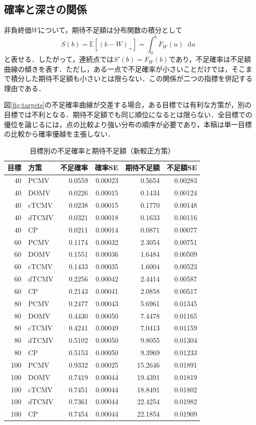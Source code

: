 \documentclass[11pt,a4paper]{article}
\numberwithin{equation}{section}
\numberwithin{table}{section}
\numberwithin{figure}{section}
\theoremstyle{plain}
\theoremstyle{definition}
\newcommand{\E}{\mathbb{E}}
\newcommand{\dd}{\mathop{}\!\mathrm{d}}
\begin{document}
\subsection{確率と深さの関係}
非負終価$W$について，期待不足額は分布関数の積分として
\begin{equation}
S(b)=\E[(b-W)_+]=\int_0^b F_W(u)\dd u
\end{equation}
と表せる．したがって，連続点では$S'(b)=F_W(b)$であり，不足確率は不足額曲線の傾きを表す．ただし，ある一点で不足確率が小さいことだけでは，そこまで積分した期待不足額も小さいとは限らない．この関係が二つの指標を併記する理由である．

図\ref{fig:targets}の不足確率曲線が交差する場合，ある目標では有利な方策が，別の目標では不利となる．期待不足額でも同じ順位になるとは限らない．全目標での優位を論じるには，点の比較より強い分布の順序が必要であり，本稿は単一目標の比較から確率優越を主張しない．

\begin{table}[htbp]\centering\small
\caption{目標別の不足確率と期待不足額（新較正方策）}\label{tab:targets}
\begin{tabular}{rlrrrr}\toprule
目標 & 方策 & 不足確率 & 確率SE & 期待不足額 & 不足額SE\\\midrule
40 & PCMV & 0.0559 & 0.00023 & 0.5654 & 0.00283 \\
40 & DOMV & 0.0226 & 0.00015 & 0.1434 & 0.00124 \\
40 & cTCMV & 0.0238 & 0.00015 & 0.1770 & 0.00148 \\
40 & dTCMV & 0.0321 & 0.00018 & 0.1633 & 0.00116 \\
40 & CP & 0.0211 & 0.00014 & 0.0871 & 0.00077 \\
\midrule
60 & PCMV & 0.1174 & 0.00032 & 2.3054 & 0.00751 \\
60 & DOMV & 0.1551 & 0.00036 & 1.6484 & 0.00509 \\
60 & cTCMV & 0.1433 & 0.00035 & 1.6004 & 0.00523 \\
60 & dTCMV & 0.2256 & 0.00042 & 2.4414 & 0.00587 \\
60 & CP & 0.2143 & 0.00041 & 2.0858 & 0.00517 \\
\midrule
80 & PCMV & 0.2477 & 0.00043 & 5.6961 & 0.01345 \\
80 & DOMV & 0.4430 & 0.00050 & 7.4478 & 0.01165 \\
80 & cTCMV & 0.4241 & 0.00049 & 7.0413 & 0.01159 \\
80 & dTCMV & 0.5102 & 0.00050 & 9.8055 & 0.01304 \\
80 & CP & 0.5153 & 0.00050 & 9.3969 & 0.01233 \\
\midrule
100 & PCMV & 0.9332 & 0.00025 & 15.2646 & 0.01891 \\
100 & DOMV & 0.7419 & 0.00044 & 19.4391 & 0.01819 \\
100 & cTCMV & 0.7451 & 0.00044 & 18.8491 & 0.01802 \\
100 & dTCMV & 0.7361 & 0.00044 & 22.4254 & 0.01982 \\
100 & CP & 0.7454 & 0.00044 & 22.1854 & 0.01909 \\
\bottomrule\end{tabular}\end{table}
\end{document}
